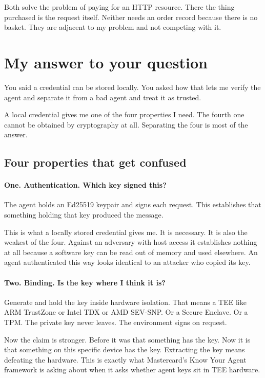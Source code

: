\documentclass[journal,onecolumn,11pt]{IEEEtran}
\begin{document}
Both solve the problem of paying for an HTTP resource. There the thing purchased is the
request itself. Neither needs an order record because there is no basket. They are
adjacent to my problem and not competing with it.

\section{My answer to your question}\label{sec:verify}

You said a credential can be stored locally. You asked how that lets me verify the agent
and separate it from a bad agent and treat it as trusted.

A local credential gives me one of the four properties I need. The fourth one cannot be
obtained by cryptography at all. Separating the four is most of the answer.

\subsection{Four properties that get confused}

\paragraph{One. Authentication. Which key signed this?}
The agent holds an Ed25519 keypair and signs each request. This establishes that
something holding that key produced the message.

This is what a locally stored credential gives me. It is necessary. It is also the
weakest of the four. Against an adversary with host access it establishes nothing at all
because a software key can be read out of memory and used elsewhere. An agent
authenticated this way looks identical to an attacker who copied its key.

\paragraph{Two. Binding. Is the key where I think it is?}
Generate and hold the key inside hardware isolation. That means a TEE like ARM TrustZone
or Intel TDX or AMD SEV-SNP. Or a Secure Enclave. Or a TPM. The private key never leaves.
The environment signs on request.

Now the claim is stronger. Before it was that something has the key. Now it is that
something on this specific device has the key. Extracting the key means defeating the
hardware. This is exactly what Mastercard's Know Your Agent framework is asking about
when it asks whether agent keys sit in TEE hardware.
\end{document}
